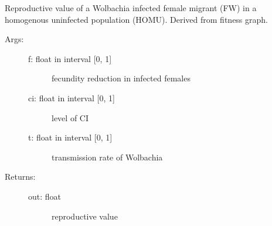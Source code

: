 \documentclass[letterpaper,10pt,english]{sphinxmanual}
\begin{document}
\begin{fulllineitems}
\label{index:wspec.analytical.reproval_FWHOMU}
Reproductive value of a Wolbachia infected female migrant (FW)
in a homogenous uninfected population (HOMU). Derived from fitness 
graph.
\begin{description}
\item[{Args:}] \leavevmode\begin{description}
\item[{f: float in interval {[}0, 1{]}}] \leavevmode
fecundity reduction in infected females

\item[{ci: float in interval {[}0, 1{]}}] \leavevmode
level of CI

\item[{t: float in interval {[}0, 1{]}}] \leavevmode
transmission rate of Wolbachia

\end{description}

\item[{Returns:}] \leavevmode\begin{description}
\item[{out: float}] \leavevmode
reproductive value

\end{description}

\end{description}

\end{fulllineitems}

\end{document}
